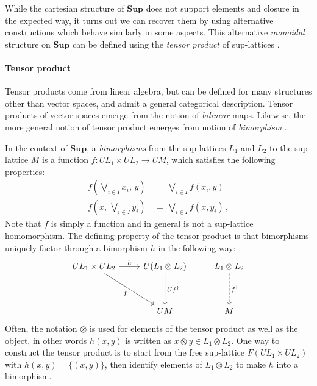 \documentclass[11pt,oneside,draft]{book}
\theoremstyle{definition}
\begin{document}

While the cartesian structure of $\mathbf{Sup}$
does not support elements and closure in the
expected way,
it turns out we can recover them by using alternative constructions
which behave similarly in some aspects.
This alternative \emph{monoidal} structure on $\mathbf{Sup}$
can be defined using the \emph{tensor product}
of sup-lattices \citep[Chapter I]{egg}.

\paragraph{Tensor product} %

Tensor products come from linear algebra,
but can be defined for many structures other than vector spaces,
and admit a general categorical description.
Tensor products of vector spaces
emerge from the notion of \emph{bilinear} maps.
Likewise,
the more general notion of tensor product
emerges from notion of \emph{bimorphism} \citep{tpbm}.

In the context of $\mathbf{Sup}$,
a \emph{bimorphisms}
from the sup-lattices $L_1$ and $L_2$
to the sup-lattice $M$
is a function $f : U L_1 \times U L_2 \rightarrow U M$,
which satisfies the following properties:
\begin{align*}
  f(\bigvee_{i \in I} x_i, \, y) \, &= \, \bigvee_{i \in I} f(x_i, y) \\
  f(x, \, \bigvee_{i \in I} y_i) \, &= \, \bigvee_{i \in I} f(x, y_i)
  \,,
\end{align*}
Note that $f$ is simply a function
and in general is not
a sup-lattice homomorphism.
The defining property of the tensor product
is that bimorphisms
uniquely factor through a bimorphism $h$
in the following way:
\begin{equation} \label{eqn:tensor}
  \begin{tikzcd}[row sep=huge]
    U L_1 \times U L_2 \ar[r, "h"] \ar[dr, "f"'] &
    U (L_1 \otimes L_2) \ar[d, "U f^\dagger"] &
    L_1 \otimes L_2 \ar[d, "f^\dagger", dashed] \\
    & U M & M
  \end{tikzcd}
\end{equation}
Often, the notation $\otimes$ is used for elements
of the tensor product as well as the object,
in other words $h(x, y)$ is written as
$x \otimes y \in L_1 \otimes L_2$.
One way to construct the tensor product
is to start from the free sup-lattice $F (U L_1 \times U L_2)$
with $h(x, y) = \{ (x, y) \}$,
then identify elements of $L_1 \otimes L_2$
to make $h$ into a bimorphism.
\end{document}
